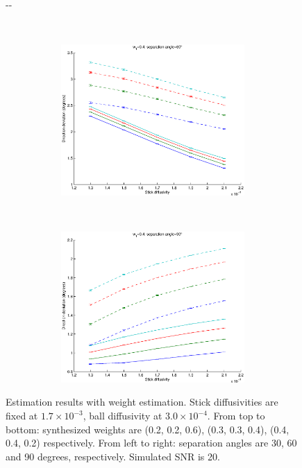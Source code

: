 \documentclass{article}
\begin{document}
\begin{figure}[H]
\begin{adjustwidth}{-\oddsidemargin}{-\rightmargin}
\begin{subfigure}{0.8\paperwidth}
\begin{subfigure}{0.3\textwidth}
      \end{subfigure}
      ~
      \begin{subfigure}{0.3\textwidth}
        \centering
        \includegraphics[width=\textwidth]{figures/synth_bas_weights__snr=20__w1=4__angle=60.eps}
      \end{subfigure}
      ~
      \begin{subfigure}{0.3\textwidth}
        \centering
        \includegraphics[width=\textwidth]{figures/synth_bas_weights__snr=20__w1=4__angle=90.eps}
      \end{subfigure}
    \end{subfigure}
  \end{adjustwidth}
  
  \caption{Estimation results with weight estimation. Stick diffusivities are fixed at $1.7\times 10^{-3}$, ball diffusivity at $3.0\times 10^{-4}$. From top to bottom: synthesized weights are (0.2, 0.2, 0.6), (0.3, 0.3, 0.4), (0.4, 0.4, 0.2) respectively. From left to right: separation angles are 30, 60 and 90 degrees, respectively. Simulated SNR is 20.}
\end{figure}
\end{document}
